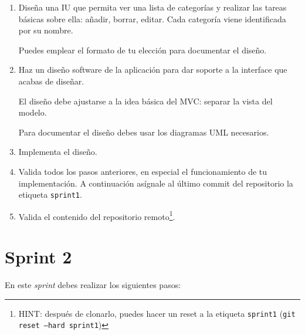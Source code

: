 \documentclass[11pt,a4paper]{article}
\begin{document}
\begin{enumerate}
\item Diseña una IU que permita ver una lista de categorías y realizar
  las tareas básicas sobre ella: añadir, borrar, editar. Cada
  categoría viene identificada por su nombre.

  Puedes emplear el formato de tu elección para documentar el diseño.

\item Haz un diseño software de la aplicación para dar soporte a la
  interface que acabas de diseñar.

  El diseño debe ajustarse a la idea básica del MVC: separar la vista
  del modelo.

  Para documentar el diseño debes usar los diagramas UML necesarios.

\item Implementa el diseño.

\item Valida todos los pasos anteriores, en especial el funcionamiento
  de tu implementación. A continuación asígnale al último commit del
  repositorio la etiqueta \texttt{sprint1}.

\item Valida el contenido del repositorio remoto\footnote{HINT:
    después de clonarlo, puedes hacer un reset a la etiqueta
    \texttt{sprint1} (\texttt{git reset --hard sprint1})}.
\end{enumerate}


\section{Sprint 2}

En este \emph{sprint} debes realizar los siguientes pasos:
\end{document}
